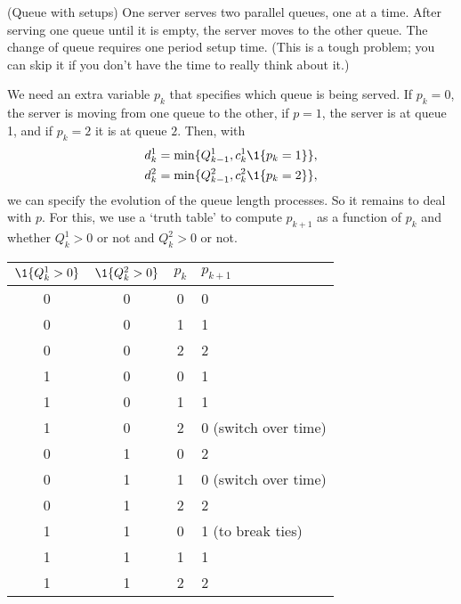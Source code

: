\begin{exercise}(Queue with setups)
  One server serves two parallel queues, one at a time. After serving
   one queue until it is empty,  the server moves to the other
  queue. The change of queue requires one period setup time. (This is a tough problem; you can skip it if you don't have the time to really think about it.)
  \begin{solution}
We need an extra variable $p_k$ that specifies  which queue is being served. If $p_k=0$, the server is moving from one queue to the other, if $p=1$, the server is at queue 1, and if $p_k=2$ it is at queue $2$. Then, with
\begin{align*}
  d^1_k &= \min\{Q^1_{k-1}, c_k^1 \1{p_k=1}\}, \\
  d^2_k &= \min\{Q^2_{k-1}, c_k^2 \1{p_k=2}\},
\end{align*}
we can specify the evolution of the queue length processes. So it remains to deal with $p$. For this, we use a `truth table' to compute $p_{k+1}$ as a function of $p_k$ and whether $Q_k^1 > 0$ or not and $Q_k^2 > 0$ or not. 

\begin{tabular}{ccc|l}
  $\1{Q^1_k > 0}$ & $\1{Q_k^2 > 0}$ & $p_k$ & $p_{k+1}$ \\ \hline
0 & 0 & 0 & 0 \\
0 & 0 & 1 & 1 \\
0 & 0 & 2 & 2 \\
1 & 0 & 0 & 1 \\
1 & 0 & 1 & 1 \\
1 & 0 & 2 & 0 (switch over time)\\
0 & 1 & 0 & 2 \\
0 & 1 & 1 & 0 (switch over time)\\
0 & 1 & 2 & 2 \\
1 & 1 & 0 & 1 (to break ties) \\
1 & 1 & 1 & 1 \\
1 & 1 & 2 & 2 \\
\end{tabular}

  \end{solution}
\end{exercise}





